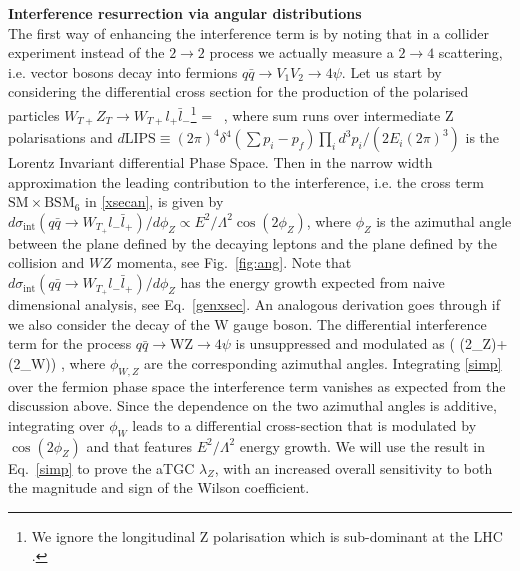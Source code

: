 \noindent
{\bf Interference resurrection via angular distributions}\\
\label{angs}
The first way of enhancing the interference term is by noting that in a collider experiment instead of the  $2\to 2$ process we actually measure a $2\to 4$ scattering, i.e. vector bosons decay into fermions $q\bar q\to V_1V_2\to 4 \psi$.  
%
Let us start by considering  the differential cross section for the production of the polarised particles $W_{T+} Z_T \rightarrow W_{T+}  l_+ \bar l_-$\footnote{ We ignore the  longitudinal Z polarisation which is sub-dominant at the LHC \cite{Baur:1994ia}.}
\be
{} =
    
\,  , \label{xsecan}
\ee
where   sum runs over intermediate Z polarisations and $d\text{LIPS}\equiv (2\pi)^4\delta^4(\sum p_i -p_f) \prod_i {d^3 p_i}/\left(2 E_i(2\pi)^3\right)$ is the Lorentz Invariant differential 
Phase Space.  
%
Then in the narrow width approximation the leading contribution to the interference, i.e. the cross term $\text{SM}\times\text{BSM}_6$ in \ref{xsecan},   is given by
$
d\sigma_\text{int}(q\bar q \rightarrow W_{T_+} l_- \bar l_+)/ d\phi_Z \propto E^2/\Lambda^2 \cos(2\phi_Z) 
$, 
where  $\phi_Z$  is the azimuthal angle between the plane defined by the decaying leptons and the plane defined by the collision and $WZ$ momenta, see Fig.~\ref{fig:ang}.  Note that $d\sigma_\text{int}(q\bar q \rightarrow W_{T_+} l_- \bar l_+)/ d\phi_Z $ has the energy growth expected from naive dimensional analysis, see  Eq.~\ref{genxsec}.
An analogous derivation goes through if we also consider the decay of the W gauge boson. The differential interference term   for the process $q\bar q\to $WZ$\to 4 \psi$ is  unsuppressed and modulated as
\bea
   \propto {}\left( \cos(2\phi_Z)+\cos(2\phi_W)\right) , \label{simp}
\eea
where $\phi_{W,Z}$ are the corresponding azimuthal angles. 
Integrating  \ref{simp} over the fermion phase space the   interference term vanishes as expected from the discussion above. 
Since the dependence on the two azimuthal angles is additive, integrating  over $\phi_W$ leads to a differential cross-section that is modulated by $\cos(2\phi_Z)$ and that features $E^2/\Lambda^2$ energy growth. 
We will use the result in Eq.~\ref{simp}  to prove the aTGC $\lambda_Z$, with an increased  overall sensitivity  to both the magnitude and sign of the Wilson coefficient.


